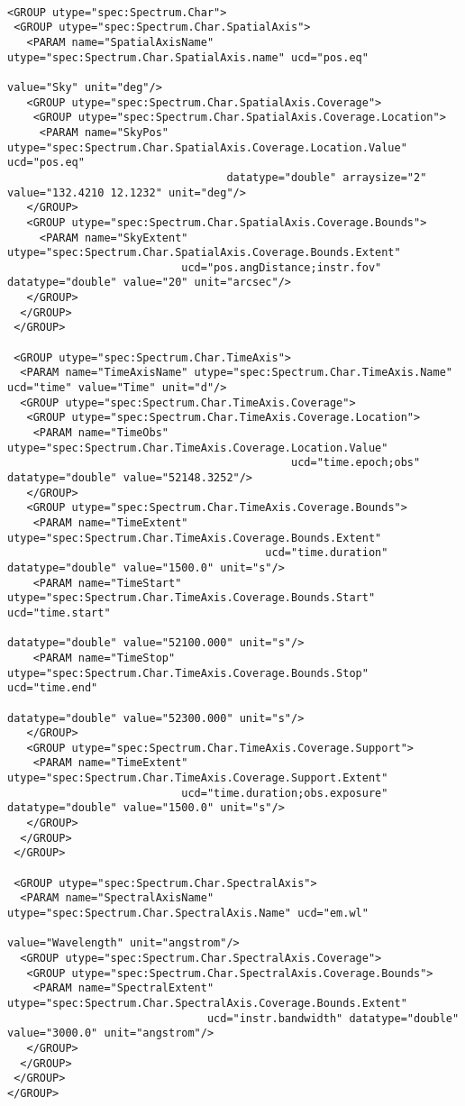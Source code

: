 {\begin{flushleft}
\begin{fmpage}
\begin{verbatim}

<GROUP utype="spec:Spectrum.Char">
 <GROUP utype="spec:Spectrum.Char.SpatialAxis">
   <PARAM name="SpatialAxisName" utype="spec:Spectrum.Char.SpatialAxis.name" ucd="pos.eq" 
                                                                               value="Sky" unit="deg"/>
   <GROUP utype="spec:Spectrum.Char.SpatialAxis.Coverage">
    <GROUP utype="spec:Spectrum.Char.SpatialAxis.Coverage.Location">
     <PARAM name="SkyPos" utype="spec:Spectrum.Char.SpatialAxis.Coverage.Location.Value" ucd="pos.eq" 
                                  datatype="double" arraysize="2" value="132.4210 12.1232" unit="deg"/>
   </GROUP>
   <GROUP utype="spec:Spectrum.Char.SpatialAxis.Coverage.Bounds">
     <PARAM name="SkyExtent" utype="spec:Spectrum.Char.SpatialAxis.Coverage.Bounds.Extent" 
                           ucd="pos.angDistance;instr.fov" datatype="double" value="20" unit="arcsec"/>
   </GROUP>
  </GROUP>
 </GROUP>

 <GROUP utype="spec:Spectrum.Char.TimeAxis">
  <PARAM name="TimeAxisName" utype="spec:Spectrum.Char.TimeAxis.Name" ucd="time" value="Time" unit="d"/>
  <GROUP utype="spec:Spectrum.Char.TimeAxis.Coverage">
   <GROUP utype="spec:Spectrum.Char.TimeAxis.Coverage.Location">
    <PARAM name="TimeObs" utype="spec:Spectrum.Char.TimeAxis.Coverage.Location.Value" 
                                            ucd="time.epoch;obs" datatype="double" value="52148.3252"/>
   </GROUP>
   <GROUP utype="spec:Spectrum.Char.TimeAxis.Coverage.Bounds">
    <PARAM name="TimeExtent" utype="spec:Spectrum.Char.TimeAxis.Coverage.Bounds.Extent" 
                                        ucd="time.duration" datatype="double" value="1500.0" unit="s"/>
    <PARAM name="TimeStart" utype="spec:Spectrum.Char.TimeAxis.Coverage.Bounds.Start" ucd="time.start"
                                                         datatype="double" value="52100.000" unit="s"/>
    <PARAM name="TimeStop" utype="spec:Spectrum.Char.TimeAxis.Coverage.Bounds.Stop" ucd="time.end"
                                                         datatype="double" value="52300.000" unit="s"/>
   </GROUP>
   <GROUP utype="spec:Spectrum.Char.TimeAxis.Coverage.Support">
    <PARAM name="TimeExtent" utype="spec:Spectrum.Char.TimeAxis.Coverage.Support.Extent" 
                           ucd="time.duration;obs.exposure" datatype="double" value="1500.0" unit="s"/>
   </GROUP>
  </GROUP>
 </GROUP>

 <GROUP utype="spec:Spectrum.Char.SpectralAxis">
  <PARAM name="SpectralAxisName" utype="spec:Spectrum.Char.SpectralAxis.Name" ucd="em.wl" 
                                                                   value="Wavelength" unit="angstrom"/>
  <GROUP utype="spec:Spectrum.Char.SpectralAxis.Coverage">
   <GROUP utype="spec:Spectrum.Char.SpectralAxis.Coverage.Bounds">
    <PARAM name="SpectralExtent" utype="spec:Spectrum.Char.SpectralAxis.Coverage.Bounds.Extent" 
                               ucd="instr.bandwidth" datatype="double" value="3000.0" unit="angstrom"/>
   </GROUP>
  </GROUP>
 </GROUP>
</GROUP>


\end{verbatim}
\end{fmpage}
\end{flushleft}}
